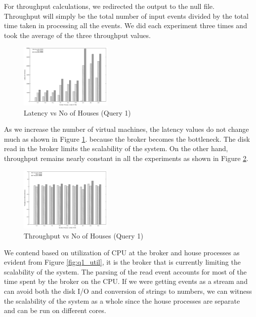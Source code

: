 For throughput calculations, we redirected the output to the null file.
Throughput will simply be the total number of input events divided by the total time taken in processing all the events.
We did each experiment three times and took the average of the three throughput values.
\begin{figure}[h]
\begin{center}
	\includegraphics[width=0.4\textwidth]{img/q1_latency}
	\vspace*{-0.4cm}
	\caption{Latency vs No of Houses (Query 1) \label{fig:q1_latency}}
\end{center}
\end{figure}

As we increase the number of virtual machines, the latency values do not change much as shown in Figure \ref{fig:q1_latency}.
because the broker becomes the bottleneck.
The disk read in the broker limits the scalability of the system.
On the other hand, throughput remains nearly constant in all the experiments as shown in Figure \ref{fig:q1_throughput}.

\begin{figure}[h]
\begin{center}
	\includegraphics[width=0.4\textwidth]{img/q1_throughput}
	\vspace*{-0.4cm}
	\caption{Throughput vs No of Houses (Query 1)\label{fig:q1_throughput}}
\end{center}
\end{figure}

We contend based on utilization of CPU at the broker and house processes as evident from Figure \ref{fig:q1_util}, it is the broker that is currently limiting the scalability of the system.
The parsing of the read event accounts for most of the time spent by the broker on the CPU.
If we were getting events as a stream and can avoid both the disk I/O and conversion of strings to numbers, we can witness the scalability of the system as a whole since the house processes are separate and can be run on different cores.


